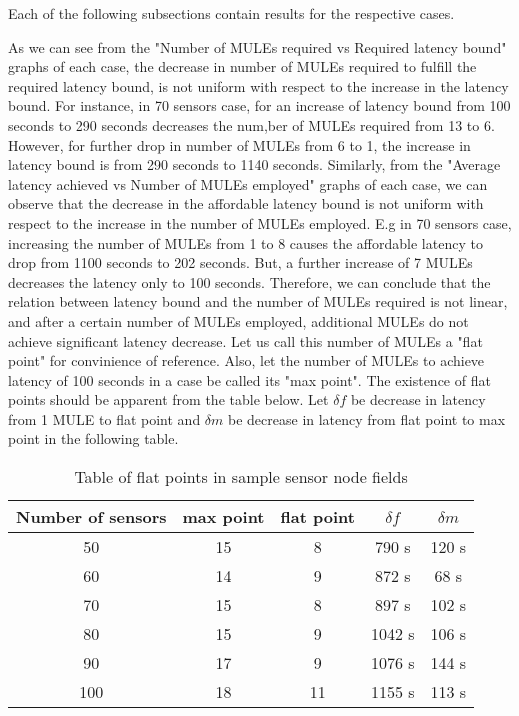 Each of the following subsections contain results for the respective cases.

As we can see from the "Number of MULEs required vs Required latency bound" graphs of each case, the decrease in number of MULEs required to fulfill the required latency bound, is not uniform with respect to the increase in the latency bound. For instance, in 70 sensors case, for an increase of latency bound from 100 seconds to 290 seconds decreases the num,ber of MULEs required from 13 to 6. However, for further drop in number of MULEs from 6 to 1, the increase in latency bound is from 290 seconds to 1140 seconds. Similarly, from the "Average latency achieved vs Number of MULEs employed" graphs of each case, we can observe that the decrease in the affordable latency bound is not uniform with respect to the increase in the number of MULEs employed. E.g in 70 sensors case, increasing the number of MULEs from 1 to 8 causes the affordable latency to drop from 1100 seconds to 202 seconds. But, a further increase of 7 MULEs decreases the latency only to 100 seconds. Therefore, we can conclude that the relation between latency bound and the number of MULEs required is not linear, and after a certain number of MULEs employed, additional MULEs do not achieve significant latency decrease. Let us call this number of MULEs a "flat point" for convinience of reference. Also, let the number of MULEs to achieve latency of 100 seconds in a case be called its "max point". The existence of flat points should be apparent from the table below. Let $\delta f$ be decrease in latency from 1 MULE to flat point and $\delta m$ be decrease in latency from flat point to max point in the following table.

\begin{table}
\centering
\caption{Table of flat points in sample sensor node fields}
 \begin{tabular}{||c c c c c||}
 \hline
 Number of sensors & max point & flat point & $\delta f$ & $\delta m$ \\  
 \hline\hline
 50 & 15 & 8 & 790 s & 120 s\\ 
 \hline
 60 & 14 & 9 & 872 s & 68 s\\
 \hline
 70 & 15 & 8 & 897 s & 102 s\\
 \hline
 80 & 15 & 9 & 1042 s & 106 s\\
 \hline
 90 & 17 & 9 & 1076 s & 144 s\\
 \hline
 100 & 18 & 11 & 1155 s & 113 s\\
 \hline
\end{tabular}
\end{table}

